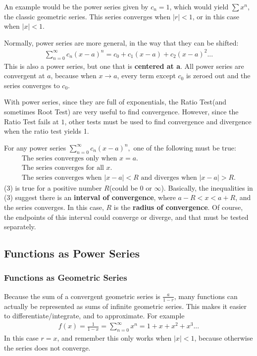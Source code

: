 \documentclass{article}
\begin{document}
An example would be the power series given by $c_n = 1$, which would yield $\sum x^n$, the classic geometric series. This series converges when $|r| < 1$, or in this case when $|x| < 1$.

Normally, power series are more general, in the way that they can be shifted:
\begin{gather*}
    \sum_{n = 0}^\infty c_n (x-a)^n = c_0 + c_1 (x-a) + c_2 (x-a)^2...
\end{gather*}
This is also a power series, but one that is \textbf{centered at a}. All power series are convergent at $a$, because when $x \to a$, every term except $c_0$ is zeroed out and the series converges to $c_0$.

With power series, since they are full of exponentials, the Ratio Test(and sometimes Root Test) are very useful to find convergence. However, since the Ratio Test fails at $1$, other tests must be used to find convergence and divergence when the ratio test yields 1.

For any power series $\sum_{n = 0}^\infty c_n (x-a)^n,$ one of the following must be true:
\begin{gather}
    \textrm{The series converges only when } x = a.\\
    \textrm{The series converges for all } x.\\
    \textrm{The series converges when $|x-a| < R$ and diverges when $|x-a| > R$.}
\end{gather}
(3) is true for a positive number $R$(could be $0$ or $\infty$). Basically, the inequalities in (3) suggest there is an \textbf{interval of convergence}, where $a - R < x < a + R$, and the series converges. In this case, $R$ is the \textbf{radius of convergence}. Of course, the endpoints of this interval could converge or diverge, and that must be tested separately.
\subsection{Functions as Power Series}
\subsubsection{Functions as Geometric Series}
Because the sum of a convergent geometric series is $\frac{a}{1-r}$, many functions can actually be represented as sums of infinite geometric series. This makes it easier to differentiate/integrate, and to approximate. For example
\begin{gather*}
    f(x) = \frac{1}{1-x} = \sum_{n=0}^\infty x^n = 1 + x + x^2 + x^3...
\end{gather*}
In this case $r=x$, and remember this only works when $|x| < 1$, because otherwise the series does not converge.
\end{document}
